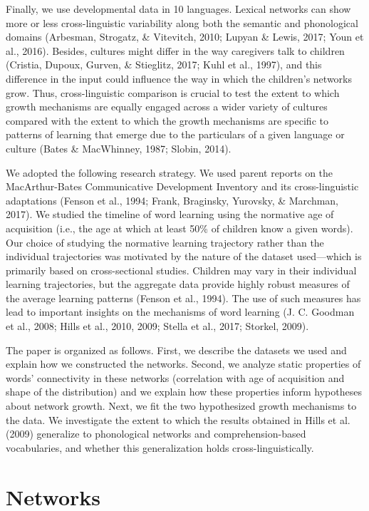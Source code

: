 \documentclass[english,floatsintext,man]{apa6}
\theoremstyle{definition}
\theoremstyle{definition}
\theoremstyle{definition}
\theoremstyle{remark}
\begin{document}
Finally, we use developmental data in 10 languages. Lexical networks can
show more or less cross-linguistic variability along both the semantic
and phonological domains (Arbesman, Strogatz, \& Vitevitch, 2010; Lupyan
\& Lewis, 2017; Youn et al., 2016). Besides, cultures might differ in
the way caregivers talk to children (Cristia, Dupoux, Gurven, \&
Stieglitz, 2017; Kuhl et al., 1997), and this difference in the input
could influence the way in which the children's networks grow. Thus,
cross-linguistic comparison is crucial to test the extent to which
growth mechanisms are equally engaged across a wider variety of cultures
compared with the extent to which the growth mechanisms are specific to
patterns of learning that emerge due to the particulars of a given
language or culture (Bates \& MacWhinney, 1987; Slobin, 2014).

We adopted the following research strategy. We used parent reports on
the MacArthur-Bates Communicative Development Inventory and its
cross-linguistic adaptations (Fenson et al., 1994; Frank, Braginsky,
Yurovsky, \& Marchman, 2017). We studied the timeline of word learning
using the normative age of acquisition (i.e., the age at which at least
50\% of children know a given words). Our choice of studying the
normative learning trajectory rather than the individual trajectories
was motivated by the nature of the dataset used---which is primarily
based on cross-sectional studies. Children may vary in their individual
learning trajectories, but the aggregate data provide highly robust
measures of the average learning patterns (Fenson et al., 1994). The use
of such measures has lead to important insights on the mechanisms of
word learning (J. C. Goodman et al., 2008; Hills et al., 2010, 2009;
Stella et al., 2017; Storkel, 2009).

The paper is organized as follows. First, we describe the datasets we
used and explain how we constructed the networks. Second, we analyze
static properties of words' connectivity in these networks (correlation
with age of acquisition and shape of the distribution) and we explain
how these properties inform hypotheses about network growth. Next, we
fit the two hypothesized growth mechanisms to the data. We investigate
the extent to which the results obtained in Hills et al. (2009)
generalize to phonological networks and comprehension-based
vocabularies, and whether this generalization holds
cross-linguistically.

\section{Networks}\label{networks}
\end{document}
